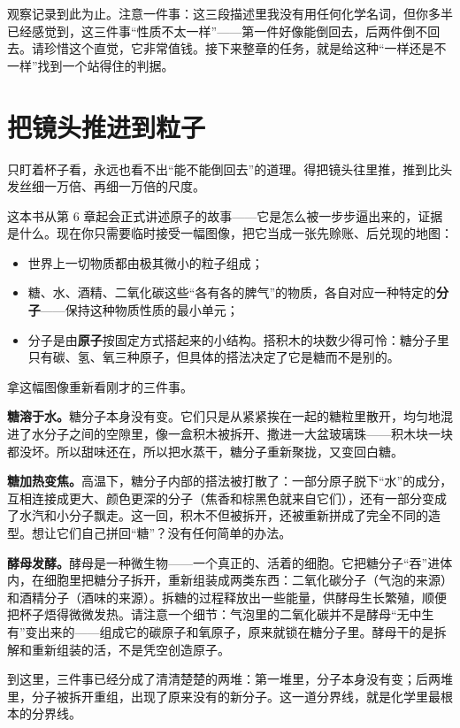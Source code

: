 观察记录到此为止。注意一件事：这三段描述里我没有用任何化学名词，但你多半已经感觉到，这三件事“性质不太一样”——第一件好像能倒回去，后两件倒不回去。请珍惜这个直觉，它非常值钱。接下来整章的任务，就是给这种“一样还是不一样”找到一个站得住的判据。

\section{把镜头推进到粒子}

只盯着杯子看，永远也看不出“能不能倒回去”的道理。得把镜头往里推，推到比头发丝细一万倍、再细一万倍的尺度。

这本书从第 6 章起会正式讲述原子的故事——它是怎么被一步步逼出来的，证据是什么。现在你只需要临时接受一幅图像，把它当成一张先赊账、后兑现的地图：

\begin{itemize}[itemsep=2pt]
\item 世界上一切物质都由极其微小的粒子组成；
\item 糖、水、酒精、二氧化碳这些“各有各的脾气”的物质，各自对应一种特定的\textbf{分子}——保持这种物质性质的最小单元；
\item 分子是由\textbf{原子}按固定方式搭起来的小结构。搭积木的块数少得可怜：糖分子里只有碳、氢、氧三种原子，但具体的搭法决定了它是糖而不是别的。
\end{itemize}

拿这幅图像重新看刚才的三件事。

\textbf{糖溶于水。}糖分子本身没有变。它们只是从紧紧挨在一起的糖粒里散开，均匀地混进了水分子之间的空隙里，像一盒积木被拆开、撒进一大盆玻璃珠——积木块一块都没坏。所以甜味还在，所以把水蒸干，糖分子重新聚拢，又变回白糖。

\textbf{糖加热变焦。}高温下，糖分子内部的搭法被打散了：一部分原子脱下“水”的成分，互相连接成更大、颜色更深的分子（焦香和棕黑色就来自它们），还有一部分变成了水汽和小分子飘走。这一回，积木不但被拆开，还被重新拼成了完全不同的造型。想让它们自己拼回“糖”？没有任何简单的办法。

\textbf{酵母发酵。}酵母是一种微生物——一个真正的、活着的细胞。它把糖分子“吞”进体内，在细胞里把糖分子拆开，重新组装成两类东西：二氧化碳分子（气泡的来源）和酒精分子（酒味的来源）。拆糖的过程释放出一些能量，供酵母生长繁殖，顺便把杯子焐得微微发热。请注意一个细节：气泡里的二氧化碳并不是酵母“无中生有”变出来的——组成它的碳原子和氧原子，原来就锁在糖分子里。酵母干的是拆解和重新组装的活，不是凭空创造原子。

到这里，三件事已经分成了清清楚楚的两堆：第一堆里，分子本身没有变；后两堆里，分子被拆开重组，出现了原来没有的新分子。这一道分界线，就是化学里最根本的分界线。

